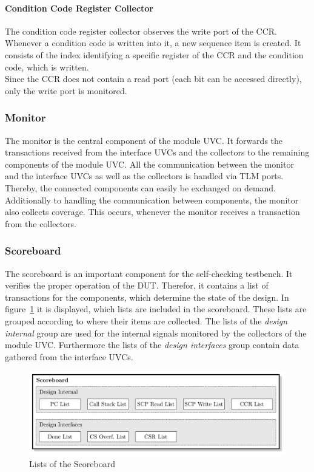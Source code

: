 \paragraph{Condition Code Register Collector}

The condition code register collector observes the write port of the CCR.
Whenever a condition code is written into it, a new sequence item is created.
It consists of the index identifying a specific register of the CCR and the condition code, which is written.\\
Since the CCR does not contain a read port (each bit can be accessed directly), only the write port is monitored.

\subsubsection{Monitor}

The monitor is the central component of the module UVC.
It forwards the transactions received from the interface UVCs and the collectors to the remaining components of the module UVC.
All the communication between the monitor and the interface UVCs as well as the collectors is handled via TLM ports.
Thereby, the connected components can easily be exchanged on demand.\\
Additionally to handling the communication between components, the monitor also collects coverage.
This occurs, whenever the monitor receives a transaction from the collectors.

\subsubsection{Scoreboard}

The scoreboard is an important component for the self-checking testbench.
It verifies the proper operation of the DUT.
Therefor, it contains a list of transactions for the components, which determine the state of the design.
In figure~\ref{fig:scoreboard} it is displayed, which lists are included in the scoreboard.
These lists are grouped according to where their items are collected.
The lists of the \emph{design internal} group are used for the internal signals monitored by the collectors of the module UVC.
Furthermore the lists of the \emph{design interfaces} group contain data gathered from the interface UVCs.

\begin{figure}[htb]
 \centering
 \includegraphics[width=1.0\textwidth,angle=0]{images/scoreboard}
 \caption{Lists of the Scoreboard}
\label{fig:scoreboard}
\end{figure}

